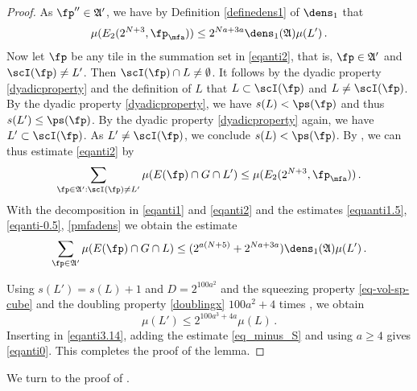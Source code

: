 \begin{proof}
As $\fp''\in \mathfrak{A}'$, we have by Definition
\eqref{definedens1} of $\dens_1$ that
\begin{equation}\label{pmfadens}
   \mu(E_2(2^{N+3}, \fp_{\mfa}))\le 2^{Na+3a}\dens_1(\mathfrak{A}) {\mu(L')}\, .
\end{equation}
Now let $\fp$ be any tile in the summation set in \eqref{eqanti2}, that is, $\fp\in \mathfrak{A}'$ and $\scI(\fp)\neq L'$.
Then $\scI(\fp)\cap L\neq \emptyset$. It follows by the dyadic property \eqref{dyadicproperty}
and the definition of $L$ that
$L\subset \scI(\fp)$ and $L\neq \scI(\fp)$. By the dyadic property \eqref{dyadicproperty}, we have
$s(L)<\ps(\fp)$ and thus $s(L')\le \ps(\fp)$. By the dyadic property
   \eqref{dyadicproperty} again, we have $L'\subset \scI(\fp)$.
As $L'\neq \scI(\fp)$, we conclude $s(L)<\ps(\fp)$.
By , we can thus estimate \eqref{eqanti2} by
\begin{equation}\label{eqanti0.5}
    \sum_{\fp\in\mathfrak{A}':\scI(\fp)\neq L'}\mu(E(\fp)\cap G\cap L')
    \le \mu (E_2(2^{N+3},\fp_{\mfa}))\, .
\end{equation}
With the decomposition in \eqref{eqanti1} and \eqref{eqanti2} and the
estimates \eqref{equanti1.5}, \eqref{eqanti-0.5}, \eqref{pmfadens} we obtain
the estimate
\begin{equation}\label{eqanti3.14}
\sum_{\fp\in\mathfrak{A}'}\mu(E(\fp)\cap G \cap L)
    \le (2^{a(N+5)}+2^{Na+3a})\dens_1(\mathfrak{A})\mu(L')\,.
\end{equation}

Using $s(L')=s(L)+1$ and $D=2^{100a^2}$ and the
squeezing property \eqref{eq-vol-sp-cube}
and the doubling property \eqref{doublingx} $100a^2+4$ times , we obtain
\begin{equation}
    \mu(L')\le 2^{100a^3+4a}\mu(L)\, .
\end{equation}
Inserting in \eqref{eqanti3.14}, adding the estimate \eqref{eq_minus_S} and using $a\ge 4$ gives \eqref{eqanti0}.
This completes the proof of the lemma.
\end{proof}



We turn to the proof of .

